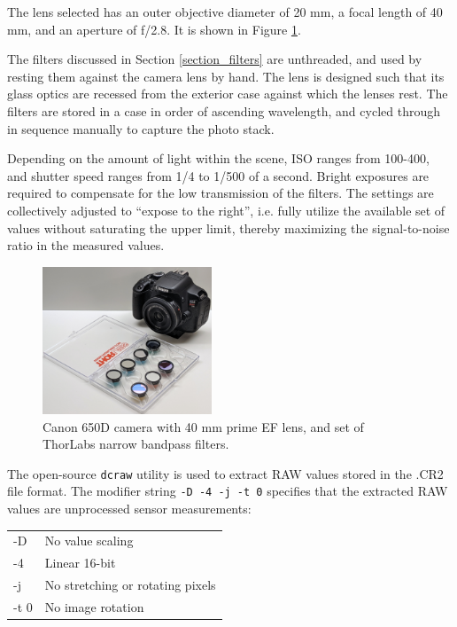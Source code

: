 \documentclass[twocolumn,10pt]{asme2ej}
\newcommand{\id}{\hspace{6 mm}}
\begin{document}
\id The lens selected has an outer objective diameter of 20 mm, a focal length of 40 mm, and an aperture of f/2.8. It is shown in Figure \ref{canon}.

\id The filters discussed in Section \ref{section_filters} are unthreaded, and used by resting them against the camera lens by hand. The lens is designed such that its glass optics are recessed from the exterior case against which the lenses rest. The filters are stored in a case in order of ascending wavelength, and cycled through in sequence manually to capture the photo stack.

\id Depending on the amount of light within the scene, ISO ranges from 100-400, and shutter speed ranges from 1/4 to 1/500 of a second. Bright exposures are required to compensate for the low transmission of the filters. The settings are collectively adjusted to ``expose to the right'', i.e. fully utilize the available set of values without saturating the upper limit, thereby maximizing the signal-to-noise ratio in the measured values.

\begin{figure}
\centering
\includegraphics[width=0.45\textwidth]{IMG_20210712_212507_GIMP.jpg}
\caption{Canon 650D camera with 40 mm prime EF lens, and set of ThorLabs narrow bandpass filters.}
\label{canon}
\end{figure}

\id The open-source \texttt{dcraw} utility is used to extract RAW values stored in the .CR2 file format. The modifier string \texttt{-D -4 -j -t 0} specifies that the extracted RAW values are unprocessed sensor measurements:\\

\begin{tabular}{l | l}
-D & No value scaling \\
-4 & Linear 16-bit \\
-j & No stretching or rotating pixels \\
-t 0 & No image rotation \\
\end{tabular} \\
\end{document}
